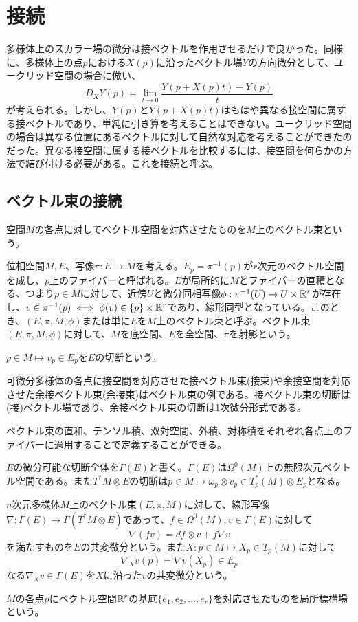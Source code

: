 \section{接続}
多様体上のスカラー場の微分は接ベクトルを作用させるだけで良かった。同様に、多様体上の点$p$における$X(p)$に沿ったベクトル場$Y$の方向微分として、ユークリッド空間の場合に倣い、
    \[D_XY(p) = \lim_{t \to 0} \frac{Y(p + X(p)t) - Y(p)}{t}\]
が考えられる。しかし、$Y(p)$と$Y(p + X(p)t)$はもはや異なる接空間に属する接ベクトルであり、単純に引き算を考えることはできない。ユークリッド空間の場合は異なる位置にあるベクトルに対して自然な対応を考えることができたのだった。異なる接空間に属する接ベクトルを比較するには、接空間を何らかの方法で結び付ける必要がある。これを接続と呼ぶ。

\subsection{ベクトル束の接続}
    空間$M$の各点に対してベクトル空間を対応させたものを$M$上のベクトル束という。

    \begin{dfn}[ベクトル束]
        位相空間$M, E$、写像$\pi: E \rightarrow M$を考える。$E_p = \pi^{-1}(p)$が$r$次元のベクトル空間を成し、$p$上のファイバーと呼ばれる。$E$が局所的に$M$とファイバーの直積となる、つまり$p \in M$に対して、近傍$U$と微分同相写像$\phi: \pi^{-1}(U) \rightarrow U \times \mathbb{R}^r$が存在し、$v \in \pi^{-1}(p) \iff \phi(v) \in \{p\} \times \mathbb{R}^r$であり、線形同型となっている。このとき、$(E, \pi, M, \phi)$または単に$E$を$M$上のベクトル束と呼ぶ。ベクトル束$(E, \pi, M, \phi)$に対して、$M$を底空間、$E$を全空間、$\pi$を射影という。

        $p \in M \mapsto v_p \in E_p$を$E$の切断という。
    \end{dfn}
    
    可微分多様体の各点に接空間を対応させた接ベクトル束(接束)や余接空間を対応させた余接ベクトル束(余接束)はベクトル束の例である。接ベクトル束の切断は(接)ベクトル場であり、余接ベクトル束の切断は1次微分形式である。

    ベクトル束の直和、テンソル積、双対空間、外積、対称積をそれぞれ各点上のファイバーに適用することで定義することができる。
    
    $E$の微分可能な切断全体を$\Gamma(E)$と書く。$\Gamma(E)$は$\Omega^0(M)$上の無限次元ベクトル空間である。また$T^*M \otimes E$の切断は$p \in M \mapsto \omega_p \otimes v_p \in T_p^*(M) \otimes E_p$となる。
    \begin{dfn}[共変微分]
        $n$次元多様体$M$上のベクトル束$(E, \pi, M)$に対して、線形写像$\nabla: \Gamma(E) \rightarrow \Gamma(T^*M \otimes E)$であって、$f \in \Omega^0(M), v \in \Gamma(E)$に対して
            \[\nabla(fv) = df \otimes v + f\nabla v\]
        を満たすものを$E$の共変微分という。また$X: p \in M \mapsto X_p \in T_p(M)$に対して
            \[\nabla_Xv(p) = \nabla v(X_p) \in E_p\]
        なる$\nabla_Xv \in \Gamma(E)$を$X$に沿った$v$の共変微分という。
    \end{dfn}
    $M$の各点$p$にベクトル空間$\mathbb{R}^r$の基底$\{e_1, e_2, \dots, e_r\}$を対応させたものを局所標構場という。
    
